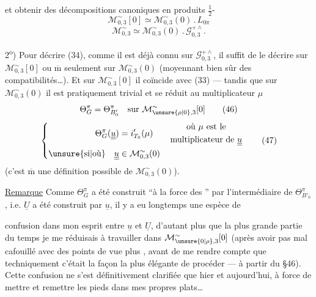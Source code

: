 

et obtenir des décompositions canoniques en produits
$\tfrac12$-
\[
\mathcal M_{0,3}^{\sim}[0]\simeq\mathcal M_{0,3}^{\sim}(0)\mathbin{.}L_{0\pi}
\tag{44}
\]
\[
\mathcal M_{0,3}^{\sim}\simeq\mathcal M_{0,3}^{\sim}(0)\mathbin{.}\mathcal G_{0,3}^{+\wedge}.
\tag{45}
\]

2\textsuperscript{o}) Pour décrire (34), comme il est déjà connu sur
$\mathcal G_{0,3}^{+\wedge}$, il suffit de le décrire sur
$\mathcal M_{0,3}^{\sim}[0]$ ou $\overline{\mathrm m}$ seulement sur
$\mathcal M_{0,3}^{\sim}(0)$ (moyennant bien sûr des compatibilités\ldots).
Et sur $\mathcal M_{0,3}^{\sim}[0]$ il coïncide avec (33) ---
tandis que sur $\mathcal M_{0,3}^{\sim}(0)$ il est pratiquement trivial
et se réduit au multiplicateur $\mu$
\[
\Theta_G^{\pi}=\Theta_{B'_0}^{\pi}
\quad\text{sur }\mathcal M_{\unsure{\rho|0},3}^{\sim}[0]
\tag{46}
\]
\[
\left\{\begin{aligned}
\Theta_G^{\pi}(\underline{\underline u})
  &=i'_{T_0}(\mu)
  \qquad\begin{gathered}\text{où }\mu\text{ est le}\\
  \text{multiplicateur de }\underline{\underline u}\end{gathered}\\
\text{\unsure{si|où}}\quad
\underline{\underline u}&\in\mathcal M_{0,3}^{\sim}(0)
\end{aligned}\right.
\tag{47}
\]
(c'est $\overline{\mathrm m}$ une définition possible de $\mathcal M_{0,3}^{\sim}(0)$).

\uline{Remarque} Comme $\Theta_G^{\pi}$ a été construit
``à la force des '' par l'intermédiaire
de $\Theta_{B'_0}^{\pi}$, i.e. $\underline U$ a été construit par $\underline u$,
il y a eu longtemps une espèce de



confusion dans mon esprit entre $\underline u$ et $\underline U$,
d'autant plus que la plus grande partie du temps je me réduisais à travailler
dans $\mathcal M_{\unsure{0|\rho},3}^{\sim}[0]$
(après avoir pas mal cafouillé avec des points de vue plus
, avant de me rendre compte que techniquement c'était
la façon la plus élégante de procéder --- à partir du \S46).
Cette confusion ne s'est définitivement clarifiée que hier et aujourd'hui,
à force de mettre et remettre les pieds dans mes propres plats\ldots

